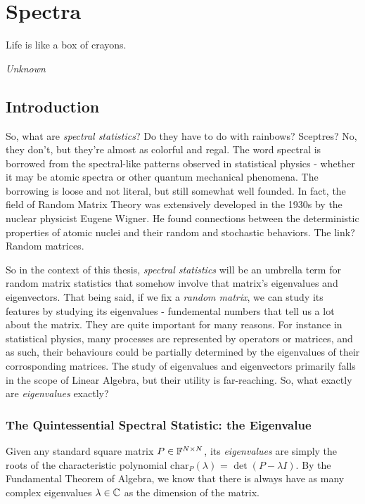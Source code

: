 
\chapter{Spectra}

\epigraph{Life is like a box of crayons.}{\textit{Unknown}}

\section{Introduction}
So, what are \textit{spectral statistics}? Do they have to do with rainbows? Sceptres? No, they don’t, but they’re almost as colorful and regal. The word spectral is borrowed from the spectral-like patterns observed in statistical physics - whether it may be atomic spectra or other quantum mechanical phenomena. The borrowing is loose and not literal, but still somewhat well founded. In fact, the field of Random Matrix Theory was extensively developed in the 1930s by the nuclear physicist Eugene Wigner. He found connections between the deterministic properties of atomic nuclei and their random and stochastic behaviors. The link? Random matrices. \newline

So in the context of this thesis, \textit{spectral statistics} will be an umbrella term for random matrix statistics that somehow involve that matrix's eigenvalues and eigenvectors. That being said, if we fix a \textit{random matrix}, we can study its features by studying its eigenvalues - fundemental numbers that tell us a lot about the matrix. They are quite important for many reasons. For instance in statistical physics, many processes are represented by operators or matrices, and as such, their behaviours could be partially determined by the eigenvalues of their corrosponding matrices. The study of eigenvalues and eigenvectors primarily falls in the scope of Linear Algebra, but their utility is far-reaching. So, what exactly are \textit{eigenvalues} exactly?


\subsection{The Quintessential Spectral Statistic: the Eigenvalue}
Given any standard square matrix $P \in \mathbb{F}^{N \times N}$, its \textit{eigenvalues} are simply the roots of the characteristic polynomial $\text{char}_P{(\lambda)}$ = $\det(P - \lambda I)$. By the Fundamental Theorem of Algebra, we know that there is always have as many complex eigenvalues $\lambda \in \mathbb{C}$ as the dimension of the matrix.

